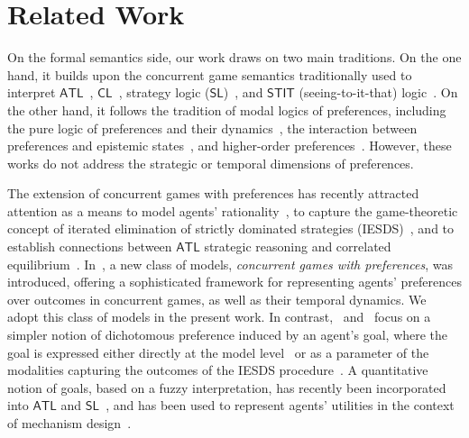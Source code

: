 \documentclass{article}
\begin{document}




 

\section{Related Work}\label{sec:relatedwork}

On the formal semantics side, our work draws on two main traditions.  
On the one hand, it builds upon the concurrent game semantics traditionally used to interpret $\mathsf{ATL}$~\cite{alur2002alternating,GorankoDrimmelenATL}, $\mathsf{CL}$~\cite{DBLP:journals/logcom/Pauly02,GorankoTARK2021}, strategy logic ($\mathsf{SL}$)~\cite{MogaveroMPV14,DBLP:conf/concur/ChatterjeeHP07}, and $\mathsf{STIT}$ (seeing-to-it-that) logic~\cite{DBLP:journals/logcom/BroersenHT06,DBLP:conf/atal/BoudouL18}.  
On the other hand, it follows the tradition of modal logics of preferences, including the pure logic of preferences and their dynamics~\cite{BenthemL07,GrossiHK22}, the interaction between preferences and epistemic states~\cite{Lorini21,Naumov2023AnEL}, and higher-order preferences~\cite{Jiang2024-JIAALO}.  
However, these works do not address the strategic or temporal dimensions of preferences.


The extension of concurrent games with preferences has recently attracted attention as a means to model agents’ rationality~\cite{DBLP:conf/ifaamas/LiLM25}, to capture the game-theoretic concept of iterated elimination of strictly dominated strategies (IESDS)~\cite{LiuEtAl2020}, and to establish connections between $\mathsf{ATL}$ strategic reasoning and correlated equilibrium~\cite{HuangRuan2017}. 
In~\cite{DBLP:conf/ifaamas/LiLM25}, a new class of models, \emph{concurrent games with preferences}, was introduced, offering a sophisticated framework for representing agents’ preferences over outcomes in concurrent games, as well as their temporal dynamics. We adopt this class of models in the present work. 
In contrast,~\cite{LiuEtAl2020} and~\cite{HuangRuan2017} focus on a simpler notion of dichotomous preference induced by an agent's goal, where the goal is expressed either directly at the model level~\cite{HuangRuan2017} or as a parameter of the modalities capturing the outcomes of the IESDS procedure~\cite{LiuEtAl2020}.
A quantitative notion of goals, based on a fuzzy interpretation, has recently been incorporated into $\mathsf{ATL}$ and $\mathsf{SL}$~\cite{jamroga2024playing,bouyer2023reasoning}, and has been used to represent agents’ utilities in the context of mechanism design~\cite{MittelmannMMP25}. 
\end{document}
